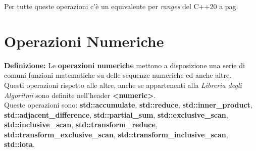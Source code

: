 \textsf{\small Per tutte queste operazioni c'è un equivalente per \emph{ranges} del C++20 a pag. \pageref{ranges}} \\


\newpage

\section{Operazioni Numeriche}

\textsf{\small \textbf{Definizione: } Le \textbf{operazioni numeriche} mettono a disposizione una serie di comuni funzioni matematiche su delle sequenze numeriche ed anche altre.} \\

\textsf{\small Questi operazioni rispetto alle altre, anche se appartenenti alla \emph{Libreria degli Algoritmi} sono definite nell'header \textbf{<numeric>}.} \\

\textsf{\small Queste operazioni sono: \textbf{std::accumulate}, \textbf{std::reduce}, \textbf{std::inner\_product}, \textbf{std::adjacent\_difference}, \textbf{std::partial\_sum}, \textbf{std::exclusive\_scan}, \textbf{std::inclusive\_scan}, \textbf{std::transform\_reduce}, \textbf{std::transform\_exclusive\_scan}, \textbf{std::transform\_inclusive\_scan}, \textbf{std::iota}.} \\

